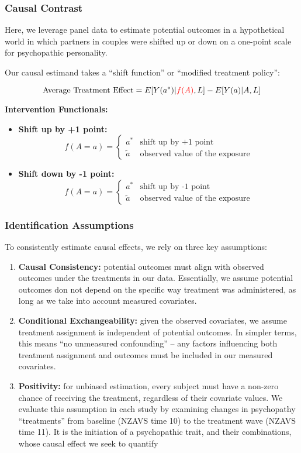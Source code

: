\documentclass[
  singlecolumn]{article}
\begin{document}
\subsubsection{Causal Contrast}\label{causal-contrast}

Here, we leverage panel data to estimate potential outcomes in a
hypothetical world in which partners in couples were shifted up or down
on a one-point scale for psychopathic personality.

Our causal estimand takes a ``shift function'' or ``modified treatment
policy'':

\[ \text{Average Treatment Effect} = E[Y(a^*)|\textcolor{red}{f(A)},L] - E[Y(a)|A,L] \]

\textbf{Intervention Functionals:}

\begin{itemize}
\item
  \textbf{Shift up by +1 point:}
  \[f(A = a) = \begin{cases} a^* & \text{shift up by +1 point} \\ \tilde{a} & \text{observed value of the exposure} \end{cases}\]
\item
  \textbf{Shift down by -1 point:}
  \[f(A = a) = \begin{cases} a^* & \text{shift up by -1 point} \\ \tilde{a} & \text{observed value of the exposure} \end{cases}\]
\end{itemize}

\subsubsection{Identification
Assumptions}\label{identification-assumptions}

To consistently estimate causal effects, we rely on three key
assumptions:

\begin{enumerate}
\def\labelenumi{\arabic{enumi}.}
\item
  \textbf{Causal Consistency:} potential outcomes must align with
  observed outcomes under the treatments in our data. Essentially, we
  assume potential outcomes don not depend on the specific way treatment
  was administered, as long as we take into account measured covariates.
\item
  \textbf{Conditional Exchangeability:} given the observed covariates,
  we assume treatment assignment is independent of potential outcomes.
  In simpler terms, this means ``no unmeasured confounding'' -- any
  factors influencing both treatment assignment and outcomes must be
  included in our measured covariates.
\item
  \textbf{Positivity:} for unbiased estimation, every subject must have
  a non-zero chance of receiving the treatment, regardless of their
  covariate values. We evaluate this assumption in each study by
  examining changes in psychopathy ``treatments'' from baseline (NZAVS
  time 10) to the treatment wave (NZAVS time 11). It is the initiation
  of a psychopathic trait, and their combinations, whose causal effect
  we seek to quantify
\end{enumerate}
\end{document}
